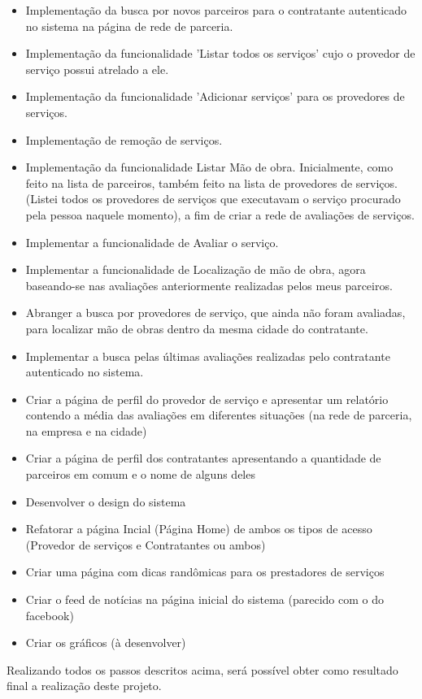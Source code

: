 \begin{itemize}
		\item Implementação da busca por novos parceiros para o contratante autenticado no sistema na página de rede de parceria.
		\item Implementação da funcionalidade 'Listar todos os serviços' cujo o provedor de serviço possui atrelado a ele.
		\item Implementação da funcionalidade 'Adicionar serviços' para os provedores de serviços.
		\item Implementação de remoção de serviços.
		\item Implementação da funcionalidade Listar Mão de obra. Inicialmente, como feito na lista de parceiros, também feito na lista de provedores de serviços. (Listei todos os provedores de serviços que executavam o serviço procurado pela pessoa naquele momento), a fim de criar a rede de avaliações de serviços.
		\item Implementar a funcionalidade de Avaliar o serviço.
		\item Implementar a funcionalidade de Localização de mão de obra, agora baseando-se nas avaliações anteriormente realizadas pelos meus parceiros.
		\item Abranger a busca por provedores de serviço, que ainda não foram avaliadas, para localizar mão de obras dentro da mesma cidade do contratante.
		\item Implementar a busca pelas últimas avaliações realizadas pelo contratante autenticado no sistema.
		\item Criar a página de perfil do provedor de serviço e apresentar um relatório contendo a média das avaliações em diferentes situações (na rede de parceria, na empresa e na cidade)
		\item Criar a página de perfil dos contratantes apresentando a quantidade de parceiros em comum e o nome de alguns deles
		\item Desenvolver o design do sistema
		\item Refatorar a página Incial (Página Home) de ambos os tipos de acesso (Provedor de serviços e Contratantes ou ambos)
		\item Criar uma página com dicas randômicas para os prestadores de serviços
		\item Criar o feed de notícias na página inicial do sistema (parecido com o do facebook)
		\item Criar os gráficos (à desenvolver)	
\end{itemize}

\par Realizando todos os passos descritos acima, será possível obter como resultado final a realização deste projeto.


